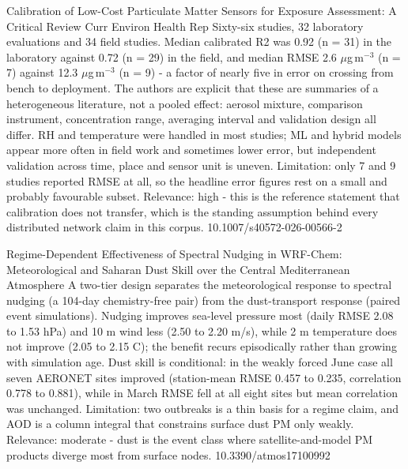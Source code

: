 \documentclass[10pt]{article}
\begin{document}
\par{}\baselineskip{}\baselineskip
{}

{Calibration of Low-Cost Particulate Matter Sensors for Exposure Assessment: A Critical Review}
{Curr Environ Health Rep}
{Sixty-six studies, 32 laboratory evaluations and 34 field studies. Median calibrated R2 was 0.92 (n = 31) in the laboratory against 0.72 (n = 29) in the field, and median RMSE 2.6 $\mu$g\,m$^{-3}$ (n = 7) against 12.3 $\mu$g\,m$^{-3}$ (n = 9) - a factor of nearly five in error on crossing from bench to deployment. The authors are explicit that these are summaries of a heterogeneous literature, not a pooled effect: aerosol mixture, comparison instrument, concentration range, averaging interval and validation design all differ. RH and temperature were handled in most studies; ML and hybrid models appear more often in field work and sometimes lower error, but independent validation across time, place and sensor unit is uneven. Limitation: only 7 and 9 studies reported RMSE at all, so the headline error figures rest on a small and probably favourable subset. Relevance: high - this is the reference statement that calibration does not transfer, which is the standing assumption behind every distributed network claim in this corpus.}
{10.1007/s40572-026-00566-2}

{Regime-Dependent Effectiveness of Spectral Nudging in WRF-Chem: Meteorological and Saharan Dust Skill over the Central Mediterranean}
{Atmosphere}
{A two-tier design separates the meteorological response to spectral nudging (a 104-day chemistry-free pair) from the dust-transport response (paired event simulations). Nudging improves sea-level pressure most (daily RMSE 2.08 to 1.53 hPa) and 10 m wind less (2.50 to 2.20 m/s), while 2 m temperature does not improve (2.05 to 2.15 C); the benefit recurs episodically rather than growing with simulation age. Dust skill is conditional: in the weakly forced June case all seven AERONET sites improved (station-mean RMSE 0.457 to 0.235, correlation 0.778 to 0.881), while in March RMSE fell at all eight sites but mean correlation was unchanged. Limitation: two outbreaks is a thin basis for a regime claim, and AOD is a column integral that constrains surface dust PM only weakly. Relevance: moderate - dust is the event class where satellite-and-model PM products diverge most from surface nodes.}
{10.3390/atmos17100992}
\end{document}
